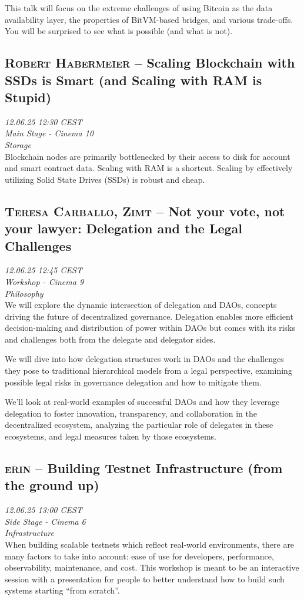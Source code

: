 This talk will focus on the extreme challenges of using Bitcoin as the data availability layer, the properties of BitVM-based bridges, and various trade-offs. You will be surprised to see what is possible (and what is not).

\clearpage
\subsection {\textsc{Robert Habermeier}  -- Scaling Blockchain with SSDs is Smart (and Scaling with RAM is Stupid)} \noindent \textit {12.06.25 12:30 CEST\\ Main Stage - Cinema 10\\ Storage}\\[1em] Blockchain nodes are primarily bottlenecked by their access to disk for account and smart contract data. Scaling with RAM is a shortcut. Scaling by effectively utilizing Solid State Drives (SSDs) is robust and cheap.

\clearpage
\subsection {\textsc{Teresa Carballo, Zimt}  -- Not your vote, not your lawyer: Delegation and the Legal Challenges} \noindent \textit {12.06.25 12:45 CEST\\ Workshop - Cinema 9\\ Philosophy}\\[1em] We will explore the dynamic intersection of delegation and DAOs, concepts driving the future of decentralized governance. Delegation enables more efficient decision-making and distribution of power within DAOs but comes with its risks and challenges both from the delegate and delegator sides.

We will dive into how delegation structures work in DAOs and the challenges they pose to traditional hierarchical models from a legal perspective, examining possible legal risks in governance delegation and how to mitigate them.

We'll look at real-world examples of successful DAOs and how they leverage delegation to foster innovation, transparency, and collaboration in the decentralized ecosystem, analyzing the particular role of delegates in these ecosystems, and legal measures taken by those ecosystems.

\clearpage
\subsection {\textsc{erin}  -- Building Testnet Infrastructure (from the ground up)} \noindent \textit {12.06.25 13:00 CEST\\ Side Stage - Cinema 6\\ Infrastructure}\\[1em] When building scalable testnets which reflect real-world environments, there are many factors to take into account: ease of use for developers, performance, observability, maintenance, and cost. This workshop is meant to be an interactive session with a presentation for people to better understand how to build such systems starting ``from scratch''.

